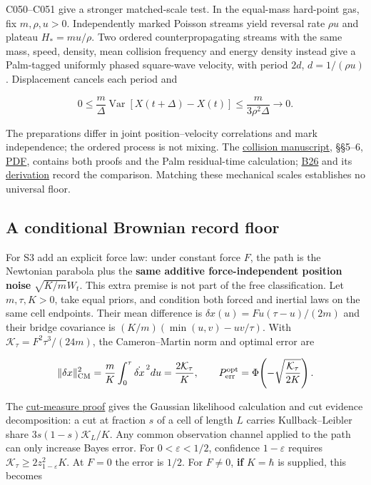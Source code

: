 \documentclass[11pt,a4paper]{article}
\begin{document}
C050--C051 give a stronger matched-scale test. In the equal-mass
hard-point gas, fix \(m,\rho,u>0\). Independently marked Poisson streams
yield reversal rate \(\rho u\) and plateau \(H_*=mu/\rho\). Two ordered
counterpropagating streams with the same mass, speed, density, mean
collision frequency and energy density instead give a Palm-tagged
uniformly phased square-wave velocity, with period \(2d\),
\(d=1/(\rho u)\). Displacement cancels each period and

\[0\le\frac m\Delta\operatorname{Var}[X(t+\Delta)-X(t)]
 \le\frac{m}{3\rho^2\Delta}\longrightarrow0.\]

The preparations differ in joint position--velocity correlations and
mark independence; the ordered process is not mixing. The
\href{../papers/collision-action-relaxation.tex}{collision manuscript},
§§5--6, \href{../out/papers/collision-action-relaxation.pdf}{PDF},
contains both proofs and the Palm residual-time calculation;
\href{../references/batches/B26.md}{B26} and its
\href{composition-universality.md}{derivation} record the comparison.
Matching these mechanical scales establishes no universal floor.

\hypertarget{a-conditional-brownian-record-floor}{%
\subsection{A conditional Brownian record
floor}\label{a-conditional-brownian-record-floor}}

For S3 add an explicit force law: under constant force \(F\), the path
is the Newtonian parabola plus the \textbf{same additive
force-independent position noise} \(\sqrt{K/m}W_t\). This extra premise
is not part of the free classification. Let \(m,\tau,K>0\), take equal
priors, and condition both forced and inertial laws on the same cell
endpoints. Their mean difference is \(\delta x(u)=Fu(\tau-u)/(2m)\) and
their bridge covariance is \((K/m)(\min(u,v)-uv/\tau)\). With
\(\mathcal K_\tau=F^2\tau^3/(24m)\), the Cameron--Martin norm and
optimal error are

\[\|\delta x\|_{\rm CM}^2
 =\frac mK\int_0^\tau\dot{\delta x}^{\,2}du
 =\frac{2\mathcal K_\tau}{K},\qquad
 P_{\rm err}^{\rm opt}=\Phi\!\left(-\sqrt{\frac{\mathcal K_\tau}{2K}}\right).\]

The \href{cut-measure-newton.md}{cut-measure proof} gives the Gaussian
likelihood calculation and cut evidence decomposition: a cut at fraction
\(s\) of a cell of length \(L\) carries Kullback--Leibler share
\(3s(1-s)\mathcal K_L/K\). Any common observation channel applied to the
path can only increase Bayes error. For \(0<\varepsilon<1/2\),
confidence \(1-\varepsilon\) requires
\(\mathcal K_\tau\ge2z_{1-\varepsilon}^2K\). At \(F=0\) the error is
\(1/2\). For \(F\ne0\), \textbf{if} \(K=\hbar\) is supplied, this
becomes
\end{document}
